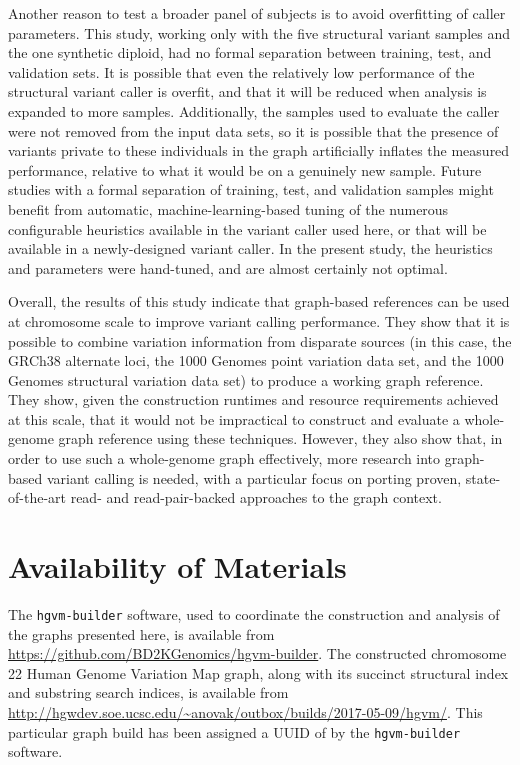 Another reason to test a broader panel of subjects is to avoid overfitting of caller parameters. This study, working only with the five structural variant samples and the one synthetic diploid, had no formal separation between training, test, and validation sets. It is possible that even the relatively low performance of the structural variant caller is overfit, and that it will be reduced when analysis is expanded to more samples. Additionally, the samples used to evaluate the caller were not removed from the input data sets, so it is possible that the presence of variants private to these individuals in the graph artificially inflates the measured performance, relative to what it would be on a genuinely new sample. Future studies with a formal separation of training, test, and validation samples might benefit from automatic, machine-learning-based tuning of the numerous configurable heuristics available in the variant caller used here, or that will be available in a newly-designed variant caller. In the present study, the heuristics and parameters were hand-tuned, and are almost certainly not optimal.

Overall, the results of this study indicate that graph-based references can be used at chromosome scale to improve variant calling performance. They show that it is possible to combine variation information from disparate sources (in this case, the GRCh38 alternate loci, the 1000 Genomes point variation data set, and the 1000 Genomes structural variation data set) to produce a working graph reference. They show, given the construction runtimes and resource requirements achieved at this scale, that it would not be impractical to construct and evaluate a whole-genome graph reference using these techniques. However, they also show that, in order to use such a whole-genome graph effectively, more research into graph-based variant calling is needed, with a particular focus on porting proven, state-of-the-art read- and read-pair-backed approaches to the graph context.


\section{Availability of Materials}

\begin{sloppypar}
The \texttt{hgvm-builder} software, used to coordinate the construction and analysis of the graphs presented here, is available from \url{https://github.com/BD2KGenomics/hgvm-builder}. The constructed chromosome 22 Human Genome Variation Map graph, along with its succinct structural index and substring search indices, is available from \url{http://hgwdev.soe.ucsc.edu/~anovak/outbox/builds/2017-05-09/hgvm/}. This particular graph build has been assigned a UUID of  by the \texttt{hgvm-builder} software.
\end{sloppypar}

